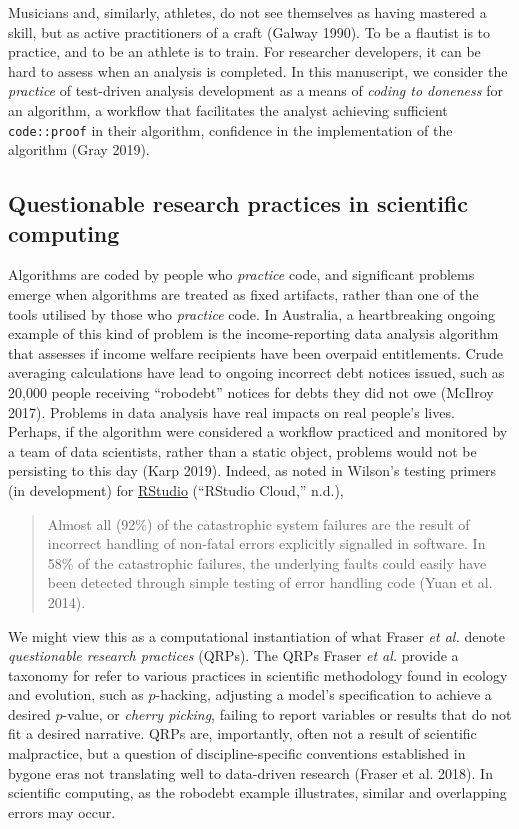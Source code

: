 \documentclass[
]{article}
\begin{document}
Musicians and, similarly, athletes, do not see themselves as having
mastered a skill, but as active practitioners of a craft (Galway 1990).
To be a flautist is to practice, and to be an athlete is to train. For
researcher developers, it can be hard to assess when an analysis is
completed. In this manuscript, we consider the \emph{practice} of
test-driven analysis development as a means of \emph{coding to doneness}
for an algorithm, a workflow that facilitates the analyst achieving
sufficient \texttt{code::proof} in their algorithm, confidence in the
implementation of the algorithm (Gray 2019).

\hypertarget{questionable-research-practices-in-scientific-computing}{%
\subsection{Questionable research practices in scientific
computing}\label{questionable-research-practices-in-scientific-computing}}

Algorithms are coded by people who \emph{practice} code, and significant
problems emerge when algorithms are treated as fixed artifacts, rather
than one of the tools utilised by those who \emph{practice} code. In
Australia, a heartbreaking ongoing example of this kind of problem is
the income-reporting data analysis algorithm that assesses if income
welfare recipients have been overpaid entitlements. Crude averaging
calculations have lead to ongoing incorrect debt notices issued, such as
20,000 people receiving ``robodebt'' notices for debts they did not owe
(McIlroy 2017). Problems in data analysis have real impacts on real
people's lives. Perhaps, if the algorithm were considered a workflow
practiced and monitored by a team of data scientists, rather than a
static object, problems would not be persisting to this day (Karp 2019).
Indeed, as noted in Wilson's testing primers (in development) for
\href{https://rstudio.cloud/learn/primers}{RStudio} (``RStudio Cloud,''
n.d.),

\begin{quote}
Almost all (92\%) of the catastrophic system failures are the result of
incorrect handling of non-fatal errors explicitly signalled in software.
In 58\% of the catastrophic failures, the underlying faults could easily
have been detected through simple testing of error handling code (Yuan
et al. 2014).
\end{quote}

We might view this as a computational instantiation of what Fraser
\emph{et al.} denote \emph{questionable research practices} (QRPs). The
QRPs Fraser \emph{et al.} provide a taxonomy for refer to various
practices in scientific methodology found in ecology and evolution, such
as \(p\)-hacking, adjusting a model's specification to achieve a desired
\(p\)-value, or \emph{cherry picking}, failing to report variables or
results that do not fit a desired narrative. QRPs are, importantly,
often not a result of scientific malpractice, but a question of
discipline-specific conventions established in bygone eras not
translating well to data-driven research (Fraser et al. 2018). In
scientific computing, as the robodebt example illustrates, similar and
overlapping errors may occur.
\end{document}
